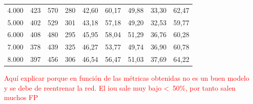 \begin{table}[ht!]
\begin{tabular}{lcccccccc}
4.000               & 423          & 570          & 280          & 42,60                                                             & 60,17                                                          & 49,88                                                           & 33,30                                                               & 62,47                                                             \\
5.000               & 402          & 529          & 301          & 43,18                                                             & 57,18                                                          & 49,20                                                           & 32,53                                                               & 59,77                                                             \\
6.000               & 408          & 480          & 295          & 45,95                                                             & 58,04                                                          & 51,29                                                           & 36,76                                                               & 60,28                                                             \\
7.000               & 378          & 439          & 325          & 46,27                                                             & 53,77                                                          & 49,74                                                           & 36,90                                                               & 60,78                                                             \\
8.000               & 397          & 456          & 306          & 46,54                                                             & 56,47                                                          & 51,03                                                           & 37,69                                                               & 64,22                                                             \\ \hline
\end{tabular}
\end{table}

\newpage

\textcolor{red}{Aquí explicar porque en función de las métricas obtenidas no es un buen modelo y se debe de reentrenar la red. El \gls{iou} sale muy bajo <\ 50\%, por tanto salen muchos FP}


